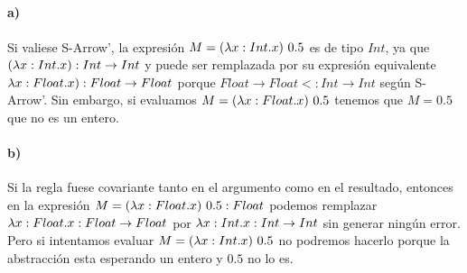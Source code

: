 \documentclass[10pt,a4paper, landscape]{article}
\begin{document}
	\newpage
	\setlength{\columnsep}{5mm}
	\begin{multicols}{2}
		\subsection{}
		\paragraph{a)} Si valiese S-Arrow', la expresión $M = (\lambda x: Int \text{.} x)~0.5$ es de tipo $Int$, ya que $(\lambda x: Int \text{.} x): Int\to Int$ y puede ser remplazada por su expresión equivalente $\lambda x: Float \text{.} x): Float\to Float$ porque $Float \to Float <: Int \to Int$ según S-Arrow'.
		Sin embargo, si evaluamos $M=(\lambda x: Float \text{.} x)~0.5$ tenemos que $M = 0.5$ que no es un entero.
		
		
		\paragraph{b)} 	Si la regla fuese covariante tanto en el argumento como en el resultado, entonces en la expresión $M=(\lambda x: Float \text{.} x)~0.5 : Float$ podemos remplazar $\lambda x: Float \text{.} x:Float\to Float$ por $\lambda x: Int \text{.} x:Int\to Int$ sin generar ningún error. Pero si intentamos evaluar $M = (\lambda x: Int \text{.} x)~0.5$ no podremos hacerlo porque la abstracción esta esperando un entero y $0.5$ no lo es.
		

\end{multicols}
\end{document}
